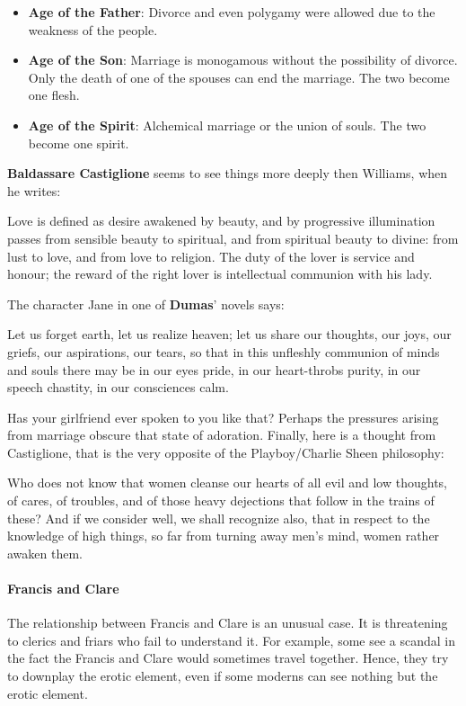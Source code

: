 \begin{itemize}
\item \textbf{Age of the Father}: Divorce and even polygamy were allowed due to the weakness of the people. 
\item \textbf{Age of the Son}: Marriage is monogamous without the possibility of divorce. Only the death of one of the spouses can end the marriage. The two become one flesh. 
\item \textbf{Age of the Spirit}: Alchemical marriage or the union of souls. The two become one spirit. 
\end{itemize}
\textbf{Baldassare Castiglione} seems to see things more deeply then Williams, when he writes:

\begin{quotex}
Love is defined as desire awakened by beauty, and by progressive illumination passes from sensible beauty to spiritual, and from spiritual beauty to divine: from lust to love, and from love to religion. The duty of the lover is service and honour; the reward of the right lover is intellectual communion with his lady. 

\end{quotex}
The character Jane in one of \textbf{Dumas}' novels says:

\begin{quotex}
Let us forget earth, let us realize heaven; let us share our thoughts, our joys, our griefs, our aspirations, our tears, so that in this unfleshly communion of minds and souls there may be in our eyes pride, in our heart-throbs purity, in our speech chastity, in our consciences calm. 

\end{quotex}
Has your girlfriend ever spoken to you like that? Perhaps the pressures arising from marriage obscure that state of adoration. Finally, here is a thought from Castiglione, that is the very opposite of the Playboy/Charlie Sheen philosophy:

\begin{quotex}
Who does not know that women cleanse our hearts of all evil and low thoughts, of cares, of troubles, and of those heavy dejections that follow in the trains of these? And if we consider well, we shall recognize also, that in respect to the knowledge of high things, so far from turning away men's mind, women rather awaken them. 

\end{quotex}
\paragraph{Francis and Clare}
The relationship between Francis and Clare is an unusual case. It is threatening to clerics and friars who fail to understand it. For example, some see a scandal in the fact the Francis and Clare would sometimes travel together. Hence, they try to downplay the erotic element, even if some moderns can see nothing but the erotic element.

